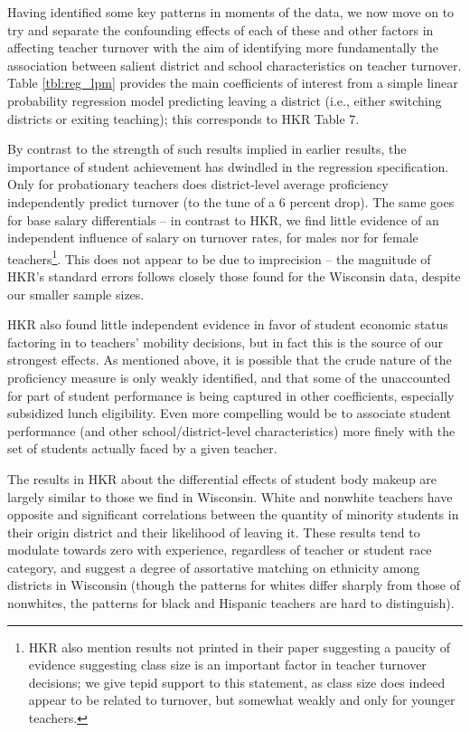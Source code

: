 \documentclass[]{article}
\let\rmarkdownfootnote\footnote%
\def\footnote{\protect\rmarkdownfootnote}
\begin{document}
Having identified some key patterns in moments of the data, we now move
on to try and separate the confounding effects of each of these and
other factors in affecting teacher turnover with the aim of identifying
more fundamentally the association between salient district and school
characteristics on teacher turnover. Table \ref{tbl:reg_lpm} provides
the main coefficients of interest from a simple linear probability
regression model predicting leaving a district (i.e., either switching
districts or exiting teaching); this corresponds to HKR Table 7.

By contrast to the strength of such results implied in earlier results,
the importance of student achievement has dwindled in the regression
specification. Only for probationary teachers does district-level
average proficiency independently predict turnover (to the tune of a 6
percent drop). The same goes for base salary differentials -- in
contrast to HKR, we find little evidence of an independent influence of
salary on turnover rates, for males nor for female teachers\footnote{HKR
  also mention results not printed in their paper suggesting a paucity
  of evidence suggesting class size is an important factor in teacher
  turnover decisions; we give tepid support to this statement, as class
  size does indeed appear to be related to turnover, but somewhat weakly
  and only for younger teachers.}. This does not appear to be due to
imprecision -- the magnitude of HKR's standard errors follows closely
those found for the Wisconsin data, despite our smaller sample sizes.

HKR also found little independent evidence in favor of student economic
status factoring in to teachers' mobility decisions, but in fact this is
the source of our strongest effects. As mentioned above, it is possible
that the crude nature of the proficiency measure is only weakly
identified, and that some of the unaccounted for part of student
performance is being captured in other coefficients, especially
subsidized lunch eligibility. Even more compelling would be to associate
student performance (and other school/district-level characteristics)
more finely with the set of students actually faced by a given teacher.

The results in HKR about the differential effects of student body makeup
are largely similar to those we find in Wisconsin. White and nonwhite
teachers have opposite and significant correlations between the quantity
of minority students in their origin district and their likelihood of
leaving it. These results tend to modulate towards zero with experience,
regardless of teacher or student race category, and suggest a degree of
assortative matching on ethnicity among districts in Wisconsin (though
the patterns for whites differ sharply from those of nonwhites, the
patterns for black and Hispanic teachers are hard to distinguish).
\end{document}

